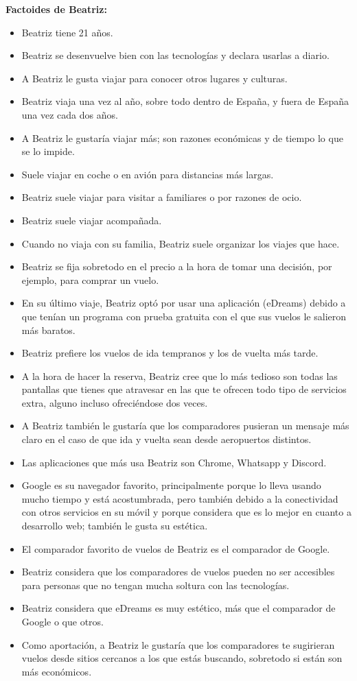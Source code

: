 \textbf{Factoides de Beatriz:}
\begin{itemize}
    \item Beatriz tiene 21 años.
    \item Beatriz se desenvuelve bien con las tecnologías y declara usarlas a diario.
    \item A Beatriz le gusta viajar para conocer otros lugares y culturas.
    \item Beatriz viaja una vez al año, sobre todo dentro de España, y fuera de España una vez cada dos años.
    \item A Beatriz le gustaría viajar más; son razones económicas y de tiempo lo que se lo impide.
    \item Suele viajar en coche o en avión para distancias más largas.
    \item Beatriz suele viajar para visitar a familiares o por razones de ocio.
    \item Beatriz suele viajar acompañada.
    \item Cuando no viaja con su familia, Beatriz suele organizar los viajes que hace.
    \item Beatriz se fija sobretodo en el precio a la hora de tomar una decisión, por ejemplo, para comprar un vuelo.
    \item En su último viaje, Beatriz optó por usar una aplicación (eDreams) debido a que tenían un programa con prueba gratuita con el que sus vuelos le salieron más baratos.
    \item Beatriz prefiere los vuelos de ida tempranos y los de vuelta más tarde.
    \item A la hora de hacer la reserva, Beatriz cree que lo más tedioso son todas las pantallas que tienes que atravesar en las que te ofrecen todo tipo de servicios extra, alguno incluso ofreciéndose dos veces.
    \item A Beatriz también le gustaría que los comparadores pusieran un mensaje más claro en el caso de que ida y vuelta sean desde aeropuertos distintos.
    \item Las aplicaciones que más usa Beatriz son Chrome, Whatsapp y Discord.
    \item Google es su navegador favorito, principalmente porque lo lleva usando mucho tiempo y está acostumbrada, pero también debido a la conectividad con otros servicios en su móvil y porque considera que es lo mejor en cuanto a desarrollo web; también le gusta su estética.
    \item El comparador favorito de vuelos de Beatriz es el comparador de Google.
    \item Beatriz considera que los comparadores de vuelos pueden no ser accesibles para personas que no tengan mucha soltura con las tecnologías.
    \item Beatriz considera que eDreams es muy estético, más que el comparador de Google o que otros.
    \item Como aportación, a Beatriz le gustaría que los comparadores te sugirieran vuelos desde sitios cercanos a los que estás buscando, sobretodo si están son más económicos.
\end{itemize}


